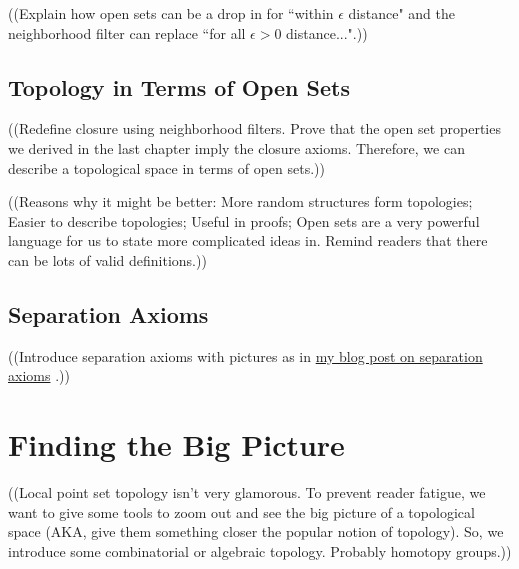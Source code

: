 \documentclass{report}
\begin{document}
((Explain how open sets can be a drop in for ``within $\epsilon$ distance" and the neighborhood filter can replace ``for all $\epsilon > 0$ distance...".))

\section{Topology in Terms of Open Sets}

((Redefine closure using neighborhood filters. Prove that the open set properties we derived in the last chapter imply the closure axioms. Therefore, we can describe a topological space in terms of open sets.))

((Reasons why it might be better: More random structures form topologies; Easier to describe topologies; Useful in proofs; Open sets are a very powerful language for us to state more complicated ideas in. Remind readers that there can be lots of valid definitions.))

\section{Separation Axioms}

((Introduce separation axioms with pictures as in \href{http://christopherolah.wordpress.com/2010/08/14/separation-axiom-visualisations}{my blog post on separation axioms} .))

\chapter{Finding the Big Picture}

((Local point set topology isn't very glamorous. To prevent reader fatigue, we want to give some tools to zoom out and see the big picture of a topological space (AKA, give them something closer the popular notion of topology). So, we introduce some combinatorial or algebraic topology. Probably homotopy groups.))
\end{document}
